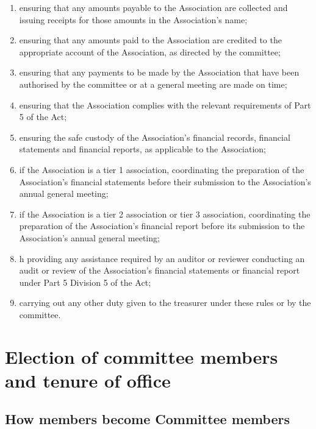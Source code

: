 \documentclass[../constitution.tex]{subfiles}
\begin{document}
\begin{enumerate}
  \item ensuring that any amounts payable to the Association are collected and issuing receipts for those amounts in the Association's name;
  \item ensuring that any amounts paid to the Association are credited to the appropriate account of the Association, as directed by the committee;
  \item ensuring that any payments to be made by the Association that have been authorised by the committee or at a general meeting are made on time;
  \item ensuring that the Association complies with the relevant requirements of Part 5 of the Act;
  \item ensuring the safe custody of the Association's financial records, financial statements and financial reports, as applicable to the Association;
  \item if the Association is a tier 1 association, coordinating the preparation of the Association's financial statements before their submission to the Association's annual general meeting;
  \item if the Association is a tier 2 association or tier 3 association, coordinating the preparation of the Association's financial report before its submission to the Association's annual general meeting;
\item h providing any assistance required by an auditor or reviewer conducting an audit or review of the Association's financial statements or financial report under Part 5 Division 5 of the Act;
  
  \item carrying out any other duty given to the treasurer under these rules or by the committee.
\end{enumerate}

\hypertarget{division-3-election-of-committee-members-and-tenure-of-office}{%
\section{Election of committee members and tenure of office}\label{division-3-election-of-committee-members-and-tenure-of-office}}

\hypertarget{how-members-become-committee-members}{%
\subsection{How members become Committee members}\label{how-members-become-committee-members}}
\end{document}
